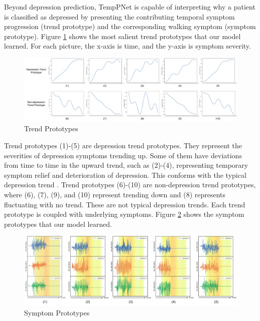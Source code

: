 \documentclass[mnsc]{informs3b} %
\begin{document}
Beyond depression prediction, TempPNet is capable of interpreting why a patient is classified as depressed by presenting the contributing temporal symptom progression (trend prototype) and the corresponding walking symptom (symptom prototype). Figure \ref{fig:trend-results} shows the most salient trend prototypes that our model learned. For each picture, the x-axis is time, and the y-axis is symptom severity.

\begin{figure}[h]
    \centering
    \includegraphics[width=1\textwidth]{imgs/trend-results.pdf}
    \caption{Trend Prototypes}
    \label{fig:trend-results}
\end{figure}

Trend prototypes (1)-(5) are depression trend prototypes. They represent the severities of depression symptoms trending up. Some of them have deviations from time to time in the upward trend, such as (2)-(4), representing temporary symptom relief and deterioration of depression. This conforms with the typical depression trend \citep{bockting_lifetime_2015}. Trend prototypes (6)-(10) are non-depression trend prototypes, where (6), (7), (9), and (10) represent trending down and (8) represents fluctuating with no trend. These are not typical depression trends. Each trend prototype is coupled with underlying symptoms. Figure \ref{fig:symptom-results} shows the symptom prototypes that our model learned.

\begin{figure}[h]
    \centering
    \includegraphics[width=1\textwidth]{imgs/symptom-result.pdf}
    \caption{Symptom Prototypes}
    \label{fig:symptom-results}
\end{figure}
\end{document}
